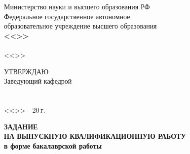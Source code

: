 
\newlength{\tlab}\newlength{\tfld}\newlength{\tlabB}\newlength{\tfldB}

\thispagestyle{empty}
\begingroup
\singlespacing
\centering

Министерство науки и высшего образования РФ\\
Федеральное государственное автономное\\
образовательное учреждение высшего образования\\
\textbf{<<\varUniversity>>}\\[\baselineskip]
\varInstitute\\[\baselineskip]
<<\varDepartment>>

\vspace{2em}

\hfill
\begin{minipage}{0.46\textwidth}
\raggedright
УТВЕРЖДАЮ\\
Заведующий кафедрой\\[0.6em]
\underline{\makebox[2.8cm]{}}~~\varHead\\[0.2em]
\\[0.6em]
<<\underline{\makebox[0.7cm]{}}>>~\underline{\makebox[2.4cm]{}}~20\underline{\makebox[0.6cm]{}}\,г.
\end{minipage}

\vspace{3\baselineskip}

\textbf{ЗАДАНИЕ}\\[0.3em]
\textbf{НА ВЫПУСКНУЮ КВАЛИФИКАЦИОННУЮ РАБОТУ}\\[0.3em]
\textbf{в форме бакалаврской работы}

\vfill
\endgroup
\clearpage

\thispagestyle{empty}
\begingroup
\singlespacing
\setlength{\parindent}{0pt}

